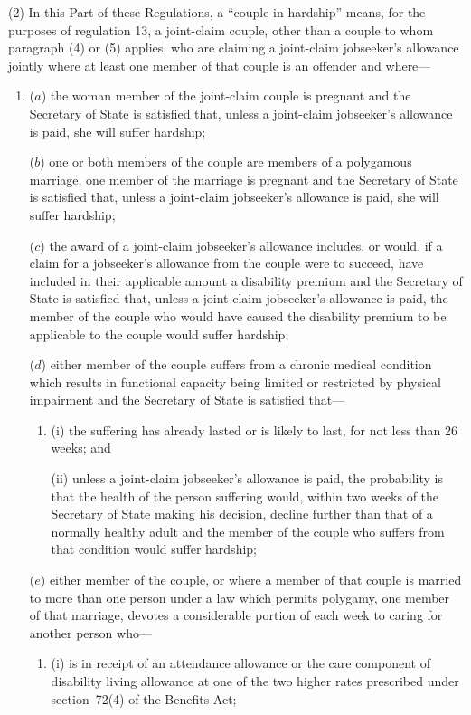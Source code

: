 \documentclass[12pt,a4paper]{article}
\begin{document}
(2) In this Part of these Regulations, a “couple in hardship” means, for the purposes of regulation 13, a joint-claim couple, other than a couple to whom paragraph (4) or (5) applies, who are claiming a joint-claim jobseeker’s allowance jointly where at least one member of that couple is an offender and where—
\begin{enumerate}\item[]
($a$) the woman member of the joint-claim couple is pregnant and the Secretary of State is satisfied that, unless a joint-claim jobseeker’s allowance is paid, she will suffer hardship;

($b$) one or both members of the couple are members of a polygamous marriage, one member of the marriage is pregnant and the Secretary of State is satisfied that, unless a joint-claim jobseeker’s allowance is paid, she will suffer hardship;

($c$) the award of a joint-claim jobseeker’s allowance includes, or would, if a claim for a jobseeker’s allowance from the couple were to succeed, have included in their applicable amount a disability premium and the Secretary of State is satisfied that, unless a joint-claim jobseeker’s allowance is paid, the member of the couple who would have caused the disability premium to be applicable to the couple would suffer hardship;

($d$) either member of the couple suffers from a chronic medical condition which results in functional capacity being limited or restricted by physical impairment and the Secretary of State is satisfied that—
\begin{enumerate}\item[]
(i) the suffering has already lasted or is likely to last, for not less than 26 weeks; and

(ii) unless a joint-claim jobseeker’s allowance is paid, the probability is that the health of the person suffering would, within two weeks of the Secretary of State making his decision, decline further than that of a normally healthy adult and the member of the couple who suffers from that condition would suffer hardship;
\end{enumerate}

($e$) either member of the couple, or where a member of that couple is married to more than one person under a law which permits polygamy, one member of that marriage, devotes a considerable portion of each week to caring for another person who—
\begin{enumerate}\item[]
(i) is in receipt of an attendance allowance or the care component of disability living allowance at one of the two higher rates prescribed under section~72(4) of the Benefits Act;


\end{enumerate}
\end{enumerate}
\end{document}
